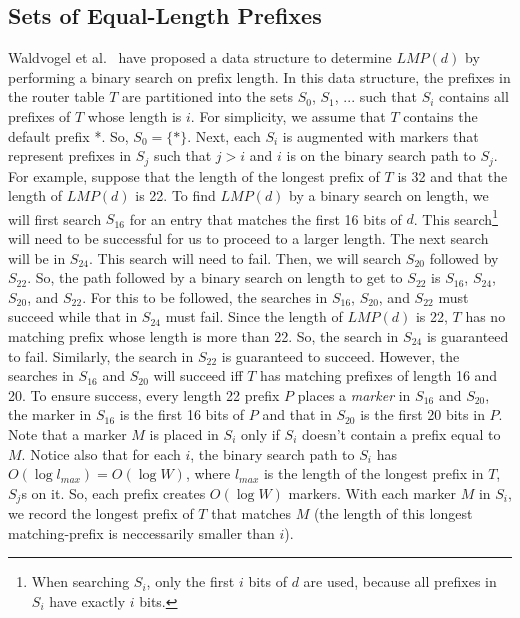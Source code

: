 \subsection{Sets of Equal-Length Prefixes}
Waldvogel et al.~\cite{wald} have proposed a data structure to determine
$LMP(d)$ by performing a binary search on prefix length.
In this data structure,
the prefixes in the router table $T$ are partitioned
into the sets $S_0$, $S_1$, $...$ such that $S_i$ contains all prefixes of
$T$ whose length is $i$. For simplicity, we assume that $T$ contains the default
prefix *. So, $S_0 = \{*\}$.
Next, each $S_i$ is augmented with markers that
represent prefixes in $S_j$ such that $j > i$ and $i$ is on the binary search
path to $S_j$. For example, suppose that the length of the longest prefix of
$T$ is 32 and that the length of $LMP(d)$ is 22. To find $LMP(d)$ by a
binary search on length, we will first search $S_{16}$ for an entry that
matches the first 16 bits of $d$. This search\footnote{When
searching $S_i$, only the first $i$ bits of $d$ are used,
because all prefixes in $S_i$
have exactly $i$ bits.} will need to be successful
for us to proceed to a larger length. The next search
will be in $S_{24}$. This search will need to fail. Then, we will search
$S_{20}$ followed by $S_{22}$. So, the path followed by a binary
search on length to get to $S_{22}$ is $S_{16}$, $S_{24}$, $S_{20}$, and
$S_{22}$.
For this to be followed, the searches in $S_{16}$, $S_{20}$, and $S_{22}$
must succeed while that in $S_{24}$ must fail.
Since the length of $LMP(d)$ is 22, $T$ has no matching prefix
whose length is more than 22.
So, the search in $S_{24}$ is guaranteed to fail. Similarly,
the search in $S_{22}$ is guaranteed to succeed.
However, the searches in $S_{16}$ and $S_{20}$ will succeed iff $T$
has matching prefixes of length 16 and 20. To ensure success, every 
length 22 prefix
$P$ places a {\em marker} in $S_{16}$ and $S_{20}$, the marker in $S_{16}$
is the first 16 bits of $P$ and that in $S_{20}$ is the first 20 bits in
$P$. Note that a marker $M$ is placed in $S_i$ only if $S_i$ doesn't contain
a prefix equal to $M$. Notice also
that for each $i$, the binary search path to $S_i$
has $O(\log l_{max}) = O(\log W)$, where $l_{max}$ is the length of the longest
prefix in $T$, $S_j$s on it. So, each prefix creates $O(\log W)$ markers.
With each marker $M$ in $S_i$, we record the longest prefix of $T$ that
matches $M$ (the length of this longest matching-prefix is neccessarily smaller
than $i$).

